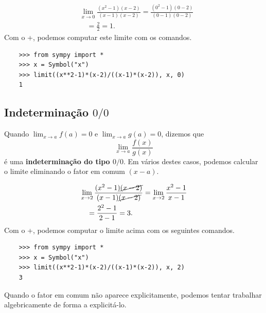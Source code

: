 \begin{ex}
  \begin{align}
    & \lim_{x\to 0} \frac{(x^2-1)(x-2)}{(x-1)(x-2)} = \frac{(0^2-1)(0-2)}{(0-1)(0-2)} \\
    & \text{}\quad = \frac{2}{2} = 1.
  \end{align}
  \ifispython
  Com o {\python}+{\sympy}, podemos computar este limite com os comandos.
  \begin{lstlisting}
    >>> from sympy import *
    >>> x = Symbol("x")
    >>> limit((x**2-1)*(x-2)/((x-1)*(x-2)), x, 0)
    1
  \end{lstlisting}
  \fi
\end{ex}

\subsection{Indeterminação $0/0$}

Quando $\displaystyle \lim_{x\to a} f(a)=0$ e $\displaystyle \lim_{x\to a} g(a)=0$, dizemos que
\begin{equation}
  \lim_{x\to a} \frac{f(x)}{g(x)}
\end{equation}
é uma {\bf indeterminação do tipo $0/0$}. Em vários destes casos, podemos calcular o limite eliminando o fator em comum $(x-a)$.

\begin{ex}
  \begin{align}
    & \lim_{x\to 2}\frac{(x^2-1)\cancel{(x-2)}}{(x-1)\cancel{(x-2)}} = \lim_{x\to 2} \frac{x^2-1}{x-1} \\
    & \text{}\quad = \frac{2^2-1}{2-1} = 3.
  \end{align}
  \ifispython
  Com o {\python}+{\sympy}, podemos computar o limite acima com os seguintes comandos.
  \begin{lstlisting}
    >>> from sympy import *
    >>> x = Symbol("x")
    >>> limit((x**2-1)*(x-2)/((x-1)*(x-2)), x, 2)
    3
  \end{lstlisting}
  \fi
\end{ex}

Quando o fator em comum não aparece explicitamente, podemos tentar trabalhar algebricamente de forma a explicitá-lo.

